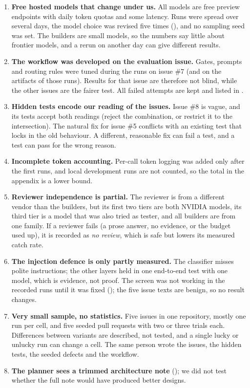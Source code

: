\begin{enumerate}
\item \textbf{Free hosted models that change under us.} All models are free preview endpoints with daily token quotas and some latency. Runs were spread over several days, the model choice was revised five times (), and no sampling seed was set. The builders are small models, so the numbers say little about frontier models, and a rerun on another day can give different results.
\item \textbf{The workflow was developed on the evaluation issue.} Gates, prompts and routing rules were tuned during the runs on issue \#7 (and on the artifacts of those runs). Results for that issue are therefore not blind, while the other issues are the fairer test. All failed attempts are kept and listed in .
\item \textbf{Hidden tests encode our reading of the issues.} Issue \#8 is vague, and its tests accept both readings (reject the combination, or restrict it to the intersection). The natural fix for issue \#5 conflicts with an existing test that locks in the old behaviour. A different, reasonable fix can fail a test, and a test can pass for the wrong reason.
\item \textbf{Incomplete token accounting.} Per-call token logging was added only after the first runs, and local development runs are not counted, so the total in the appendix is a lower bound.
\item \textbf{Reviewer independence is partial.} The reviewer is from a different vendor than the builders, but its first two tiers are both NVIDIA models, its third tier is a model that was also tried as tester, and all builders are from one family. If a reviewer fails (a prose answer, no evidence, or the budget used up), it is recorded as \emph{no review}, which is safe but lowers its measured catch rate.
\item \textbf{The injection defence is only partly measured.} The classifier misses polite instructions; the other layers held in one end-to-end test with one model, which is evidence, not proof. The screen was not working in the recorded runs until it was fixed (); the five issue texts are benign, so no result changes.
\item \textbf{Very small sample, no statistics.} Five issues in one repository, mostly one run per cell, and five seeded pull requests with two or three trials each. Differences between variants are described, not tested, and a single lucky or unlucky run can change a cell. The same person wrote the issues, the hidden tests, the seeded defects and the workflow.
\item \textbf{The planner sees a trimmed architecture note} (); we did not test whether the full note would have produced better designs.
\end{enumerate}
